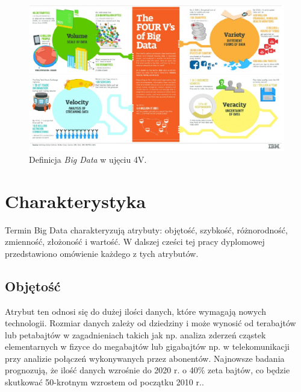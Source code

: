 \begin{figure}[h] %
	\centering
	\includegraphics[width=1.0\linewidth]{img/big_data_4_v}
	\caption{Definicja \textit{Big Data} w ujęciu 4V.}
\end{figure}

\section{Charakterystyka}
Termin Big Data charakteryzują atrybuty: objętość, szybkość, różnorodność, zmienność, złożoność i wartość. W dalszej cześci tej pracy dyplomowej przedstawiono omówienie każdego z tych atrybutów.

\subsection{Objętość}
Atrybut ten odnosi się do dużej ilości danych, które wymagają nowych technologii. Rozmiar danych zależy od dziedziny i może wynosić od terabajtów lub petabajtów w zagadnieniach takich jak np. analiza zderzeń cząstek elementarnych w fizyce do megabajtów lub gigabajtów np. w telekomunikacji przy analizie połączeń wykonywanych przez abonentów. Najnowsze badania prognozują, że ilość danych wzrośnie do 2020 r. o 40\% zeta bajtów, co będzie skutkować 50-krotnym wzrostem od początku 2010 r..